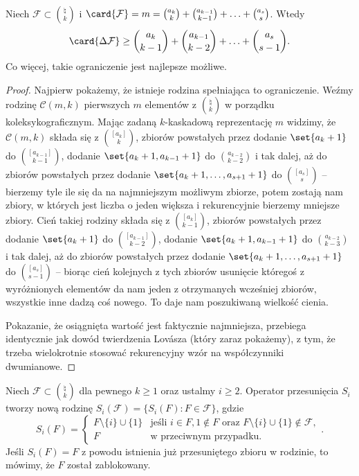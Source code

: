 \begin{theorem}
	Niech $\mathcal F\subset\binom{\natural}{k}$ i $\card{\mathcal F} = m =
		\binom{a_k}{k} + \binom{a_{k-1}}{k-1} + \ldots + \binom{a_s}{s}$. Wtedy
	$$\card{\Delta\mathcal F} \ge \binom{a_k}{k-1} + \binom{a_{k-1}}{k-2} +
		\ldots + \binom{a_s}{s-1}.$$
	Co więcej, takie ograniczenie jest najlepsze możliwe.
\end{theorem}
\begin{proof}
	Najpierw pokażemy, że istnieje rodzina spełniająca to ograniczenie. Weźmy
	rodzinę $\mathcal C(m,k)$ pierwszych $m$ elementów z $\binom{\natural}{k}$ w
	porządku koleksykograficznym. Mając zadaną $k$-kaskadową reprezentację $m$
	widzimy, że $\mathcal C(m,k)$ składa się z $\binom{[a_k]}{k}$, zbiorów
	powstałych przez dodanie $\set{a_k+1}$ do $\binom{[a_{k-1}]}{k-1}$, dodanie
	$\set{a_k+1, a_{k-1}+1}$ do $\binom{a_{k-2}}{k-2}$ i tak dalej, aż do zbiorów
	powstałych przez dodanie $\set{a_k+1,\ldots,a_{s+1}+1}$ do $\binom{[a_s]}{s}$
	-- bierzemy tyle ile się da na najmniejszym możliwym zbiorze, potem zostają
	nam zbiory, w których jest liczba o jeden większa i rekurencyjnie bierzemy
	mniejsze zbiory. Cień takiej rodziny składa się z $\binom{[a_k]}{k-1}$,
	zbiorów powstałych przez dodanie $\set{a_k+1}$ do $\binom{[a_{k-1}]}{k-2}$,
	dodanie $\set{a_k+1, a_{k-1}+1}$ do $\binom{a_{k-2}}{k-3}$ i tak dalej, aż do
	zbiorów powstałych przez dodanie $\set{a_k+1,\ldots,a_{s+1}+1}$ do
	$\binom{[a_s]}{s-1}$ -- biorąc cień kolejnych z tych zbiorów usunięcie
	któregoś z wyróżnionych elementów da nam jeden z otrzymanych wcześniej
	zbiorów, wszystkie inne dadzą coś nowego. To daje nam poszukiwaną wielkość
	cienia.

	Pokazanie, że osiągnięta wartość jest faktycznie najmniejsza, przebiega
	identycznie jak dowód twierdzenia Lov\'asza (który zaraz pokażemy),
	z tym, że trzeba wielokrotnie stosować rekurencyjny wzór na współczynniki dwumianowe.
\end{proof}

\begin{definition} Niech $\mathcal F \subset \binom{\natural}{k}$ dla pewnego $k \geq 1$ oraz ustalmy $i \geq 2$. Operator przesunięcia $S_i$ tworzy nową rodzinę $S_i(\mathcal F) = \{S_i(F) : F \in \mathcal F\}$, gdzie
	\[ S_i(F) =
		\begin{cases}
			F \setminus \{i\} \cup \{1\} & \text{jeśli } i \in F, 1 \notin F \text{ oraz } F \setminus \{i\} \cup \{1\} \notin\mathcal F, \\
			F                            & \text{w przeciwnym przypadku}.
		\end{cases}
		.\]
	Jeśli $S_i(F)=F$ z powodu istnienia już przesuniętego zbioru w rodzinie, to mówimy, że $F$ został zablokowany.
\end{definition}

